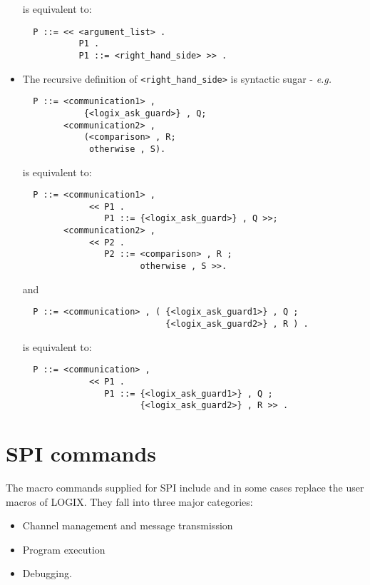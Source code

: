 \begin{itemize}
\noindent
is equivalent to:

\begin{verbatim}
  P ::= << <argument_list> .
           P1 .
           P1 ::= <right_hand_side> >> .
\end{verbatim}

\item
The recursive definition of \verb+<right_hand_side>+ is syntactic
sugar - {\em e.g.}

\begin{verbatim}
  P ::= <communication1> ,
            {<logix_ask_guard>} , Q;
        <communication2> ,
            (<comparison> , R;
             otherwise , S).
\end{verbatim}

\noindent
is equivalent to:

\begin{verbatim}
  P ::= <communication1> ,
             << P1 .
                P1 ::= {<logix_ask_guard>} , Q >>;
        <communication2> ,
             << P2 .
                P2 ::= <comparison> , R ;
                       otherwise , S >>.
\end{verbatim}

\noindent
and

\begin{verbatim}
  P ::= <communication> , ( {<logix_ask_guard1>} , Q ;
                            {<logix_ask_guard2>} , R ) .
\end{verbatim}

\noindent
is equivalent to:

\begin{verbatim}
  P ::= <communication> , 
             << P1 .
                P1 ::= {<logix_ask_guard1>} , Q ;
                       {<logix_ask_guard2>} , R >> .
\end{verbatim}

\end{itemize}

\chapter{SPI commands}
\label{commands}

The macro commands supplied for SPI include and in some cases replace
the user macros of LOGIX.  They fall into three major
categories:

\begin{itemize}
\item Channel management and message transmission
\item Program execution
\item Debugging.
\end{itemize}


